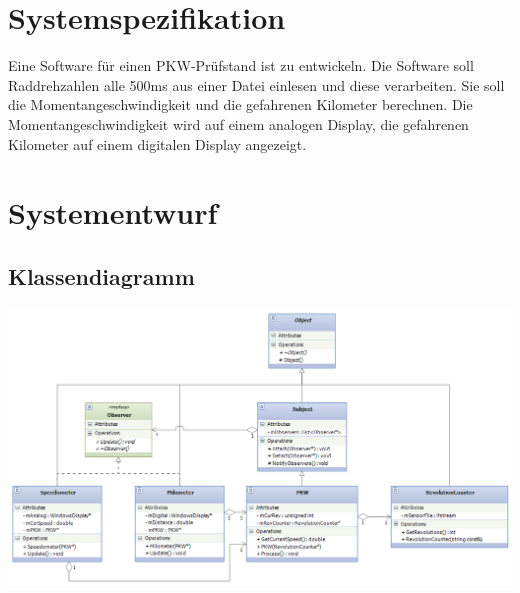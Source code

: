 \documentclass[12pt,a4paper]{article}
\begin{document}
\section{Systemspezifikation}
Eine Software für einen PKW-Prüfstand ist zu entwickeln. Die Software soll Raddrehzahlen alle 500ms aus einer Datei einlesen und diese verarbeiten. Sie soll die Momentangeschwindigkeit und die gefahrenen Kilometer berechnen. Die Momentangeschwindigkeit wird auf einem analogen Display, die gefahrenen Kilometer auf einem digitalen Display angezeigt.
\\


\newpage
\section {Systementwurf}

\subsection {Klassendiagramm}

\includegraphics[angle=90,scale=0.85] {../Klassendiagramm.png}

\newpage
\end{document}
